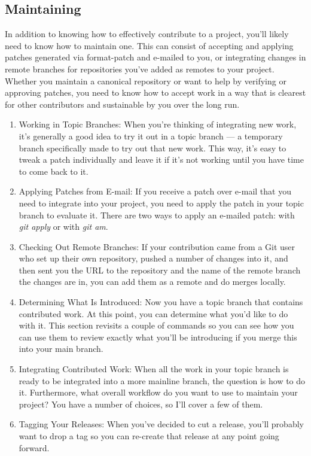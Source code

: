 \documentclass[draftclsnofoot,journal,onecolumn,12pt]{IEEEtran}
\begin{document}
\subsection{Maintaining}
In addition to knowing how to effectively contribute to a project, you’ll likely need to know how to maintain one. This can consist of accepting and applying patches generated via format-patch and e-mailed to you, or integrating changes in remote branches for repositories you’ve added as remotes to your project. Whether you maintain a canonical repository or want to help by verifying or approving patches, you need to know how to accept work in a way that is clearest for other contributors and sustainable by you over the long run.
\begin{enumerate}
  \item Working in Topic Branches: When you’re thinking of integrating new work, it’s generally a good idea to try it out in a topic branch — a temporary branch specifically made to try out that new work. This way, it’s easy to tweak a patch individually and leave it if it’s not working until you have time to come back to it.
  \item Applying Patches from E-mail: If you receive a patch over e-mail that you need to integrate into your project, you need to apply the patch in your topic branch to evaluate it. There are two ways to apply an e-mailed patch: with \textit{git apply} or with \textit{git am}.
  \item Checking Out Remote Branches: If your contribution came from a Git user who set up their own repository, pushed a number of changes into it, and then sent you the URL to the repository and the name of the remote branch the changes are in, you can add them as a remote and do merges locally.
  \item Determining What Is Introduced: Now you have a topic branch that contains contributed work. At this point, you can determine what you’d like to do with it. This section revisits a couple of commands so you can see how you can use them to review exactly what you’ll be introducing if you merge this into your main branch.
  \item Integrating Contributed Work: When all the work in your topic branch is ready to be integrated into a more mainline branch, the question is how to do it. Furthermore, what overall workflow do you want to use to maintain your project? You have a number of choices, so I’ll cover a few of them.
  \item Tagging Your Releases: When you’ve decided to cut a release, you’ll probably want to drop a tag so you can re-create that release at any point going forward.

\end{enumerate}
\end{document}
